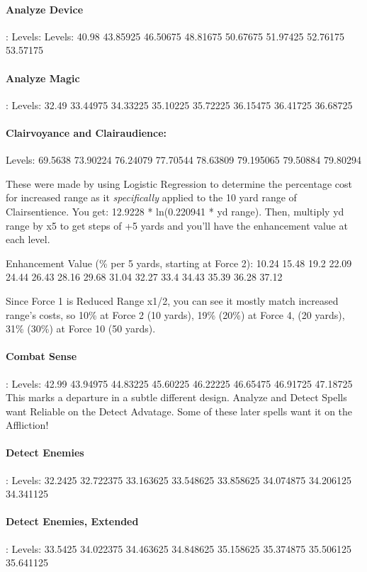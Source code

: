 \begin{multicols*}{2}
	\paragraph{Analyze Device}: Levels: Levels: 40.98 43.85925 46.50675 48.81675 50.67675 51.97425 52.76175 53.57175
	
	\paragraph{Analyze Magic}: Levels: 32.49 33.44975 34.33225 35.10225 35.72225 36.15475 36.41725 36.68725
	
		
	\paragraph{Clairvoyance and Clairaudience: } Levels: 69.5638 73.90224 76.24079 77.70544 78.63809 79.195065 79.50884 79.80294
	
	These were made by using Logistic Regression to determine the percentage cost for increased range as it \textit{specifically} applied to the 10 yard range of Clairsentience. You get: 12.9228 * ln(0.220941 * yd range). Then, multiply yd range by x5 to get steps of +5 yards and you'll have the enhancement value at each level.
	
	Enhancement Value (\% per 5 yards, starting at Force 2): 10.24 15.48 19.2 22.09 24.44 26.43 28.16 29.68 31.04 32.27 33.4 34.43 35.39 36.28 37.12
	
	Since Force 1 is Reduced Range x1/2, you can see it mostly match increased range's costs, so 10\% at Force 2 (10 yards), 19\% (20\%) at Force 4, (20 yards), 31\% (30\%) at Force 10 (50 yards).
	
	\paragraph{Combat Sense}: Levels: 42.99 43.94975 44.83225 45.60225 46.22225 46.65475 46.91725 47.18725
	This marks a departure in a subtle different design. Analyze and Detect Spells want Reliable on the Detect Advatage. Some of these later spells want it on the Affliction!
	
	\paragraph{Detect Enemies}: Levels: 32.2425 32.722375 33.163625 33.548625 33.858625 34.074875 34.206125 34.341125
	
	\paragraph{Detect Enemies, Extended}: Levels: 33.5425 34.022375 34.463625 34.848625 35.158625 35.374875 35.506125 35.641125
	

\end{multicols*}
